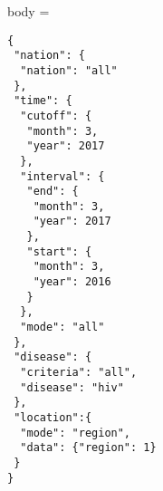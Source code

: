 \begin{multicols}{2}
body = 
\begin{verbatim}
{
 "nation": {
  "nation": "all"
 },
 "time": {
  "cutoff": {
   "month": 3,
   "year": 2017
  },
  "interval": {
   "end": {
    "month": 3,
    "year": 2017
   },
   "start": {
    "month": 3,
    "year": 2016
   }
  },
  "mode": "all"
 },
 "disease": {
  "criteria": "all",
  "disease": "hiv"
 },
 "location":{
  "mode": "region",
  "data": {"region": 1}
 }
}
\end{verbatim}
\end{multicols}